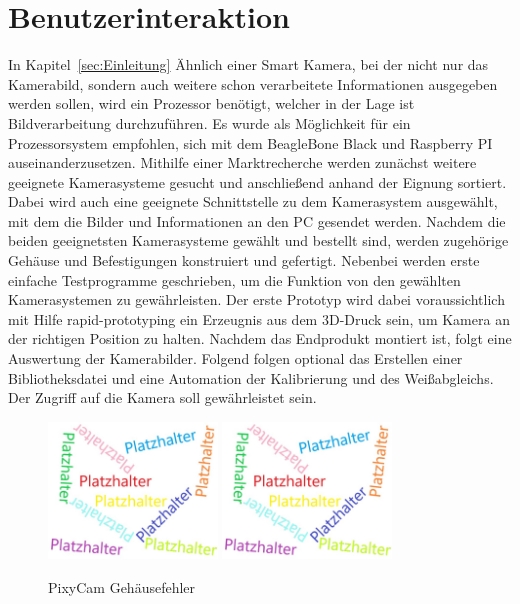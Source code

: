 \section{Benutzerinteraktion}
In Kapitel~\ref{sec:Einleitung} Ähnlich einer Smart Kamera, bei der nicht nur das Kamerabild, sondern auch weitere schon verarbeitete Informationen ausgegeben werden sollen, wird ein Prozessor benötigt, welcher in der Lage ist Bildverarbeitung durchzuführen. Es wurde als Möglichkeit für ein Prozessorsystem empfohlen, sich mit dem BeagleBone Black und Raspberry PI auseinanderzusetzen. Mithilfe einer Marktrecherche werden zunächst weitere geeignete Kamerasysteme gesucht und anschließend anhand der Eignung sortiert. Dabei wird auch eine geeignete Schnittstelle zu dem Kamerasystem ausgewählt, mit dem die Bilder und Informationen an den PC gesendet werden. Nachdem die beiden geeignetsten Kamerasysteme gewählt und bestellt sind, werden zugehörige Gehäuse und Befestigungen konstruiert und gefertigt. Nebenbei werden erste einfache Testprogramme geschrieben, um die Funktion von den gewählten Kamerasystemen zu gewährleisten. Der erste Prototyp wird dabei voraussichtlich mit Hilfe rapid-prototyping ein Erzeugnis aus dem 3D-Druck sein, um Kamera an der richtigen Position zu halten. Nachdem das Endprodukt montiert ist, folgt eine Auswertung der Kamerabilder. Folgend folgen optional das Erstellen einer Bibliotheksdatei und eine Automation der Kalibrierung und des Weißabgleichs. Der Zugriff auf die Kamera soll gewährleistet sein. 

\begin{figure}[htb]
    \centering
    \includegraphics[width=0.4\textwidth]{Abbildungen/Platzhalter.jpg}
    \includegraphics[width=0.4\textwidth]{Abbildungen/Platzhalter.jpg}
    \caption{PixyCam Gehäusefehler}		
    \label{fig:Pixy_Fehler}
\end{figure}

